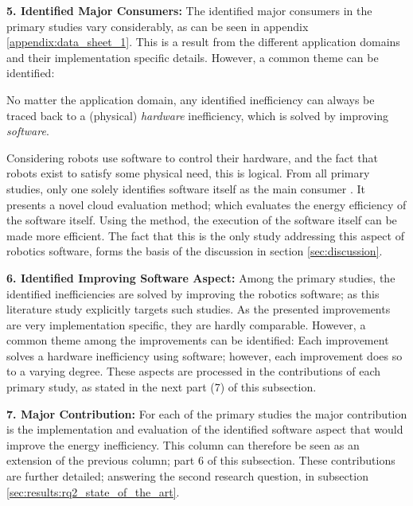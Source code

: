\vspace{5mm}

\noindent\textbf{5. Identified Major Consumers:}
The identified major consumers in the primary studies vary considerably, as can be seen in appendix \ref{appendix:data_sheet_1}.
This is a result from the different application domains and their implementation specific details.
However, a common theme can be identified:

\vspace{2mm}

No matter the application domain, any identified inefficiency can always be traced back to a (physical) \textit{hardware} inefficiency, 
which is solved by improving \textit{software}.

\vspace{2mm}

Considering robots use software to control their hardware, and the fact that robots exist to satisfy some physical need, this is logical.
From all primary studies, only one solely identifies software itself as the main consumer \cite{hou2017novel_cloud_evaluation_model}.
It presents a novel cloud evaluation method; which evaluates the energy efficiency of the software itself.
Using the method, the execution of the software itself can be made more efficient. 
The fact that this is the only study addressing this aspect of robotics software, forms the basis of the discussion in section \ref{sec:discussion}.

\vspace{5mm}

\noindent\textbf{6. Identified Improving Software Aspect:}
Among the primary studies, the identified inefficiencies are solved by improving the robotics software;
as this literature study explicitly targets such studies.
As the presented improvements are very implementation specific, they are hardly comparable.
However, a common theme among the improvements can be identified:
Each improvement solves a hardware inefficiency using software; however, each improvement does so to a varying degree. 
These aspects are processed in the contributions of each primary study, 
as stated in the next part (7) of this subsection.

\vspace{5mm}

\noindent\textbf{7. Major Contribution:}
For each of the primary studies the major contribution is the implementation and evaluation of the identified software aspect that would
improve the energy inefficiency. 
This column can therefore be seen as an extension of the previous column; part 6 of this subsection.
These contributions are further detailed; answering the second research question, in subsection \ref{sec:results:rq2_state_of_the_art}.

